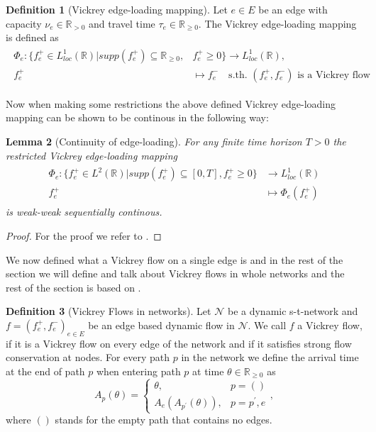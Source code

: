 \documentclass[reqno,openany]{amsbook}
\theoremstyle{definition}
\newtheorem{definition}{Definition}[chapter]
\theoremstyle{plain}
\newtheorem{lemma}[definition]{Lemma}
\begin{document}
\begin{definition}[Vickrey edge-loading mapping]
Let $e \in E$ be an edge with capacity $\nu_e \in \mathbb{R}_{> 0}$ and travel time $\tau_e \in \mathbb{R}_{\geq 0}$. The Vickrey edge-loading mapping is defined as
\begin{align}
	\begin{split}
		\Phi_e: \{f_e^+ \in L_{loc}^1(\mathbb{R}) \vert supp(f_e^+) \subseteq \mathbb{R}_{\geq 0}, &f_e^+ \geq 0\} \to 
		L_{loc}^1(\mathbb{R}), \\
		f_e^+ &\mapsto f_e^- \quad \text{s.th. $(f_e^+, f_e^-)$ is a Vickrey flow}
	\end{split}
\end{align}
\end{definition}

Now when making some restrictions the above defined Vickrey edge-loading mapping can be shown to be continous in the following way:

\begin{lemma}[Continuity of edge-loading]
For any finite time horizon $T > 0$ the restricted Vickrey edge-loading mapping 
\begin{align}
	\begin{split}
		\Phi_e: \{f_e^+ \in L^2(\mathbb{R}) \vert supp(f_e^+) \subseteq [0, T], f_e^+ \geq 0\} &\to L_{loc}^1(\mathbb{R})\\
		f_e^+ &\mapsto \Phi_e(f_e^+)
	\end{split}
\end{align}
is weak-weak sequentially continous.
\end{lemma}

\begin{proof}
For the proof we refer to {\cite[Corollary 3.46]{GRA1}}.
\end{proof}

We now defined what a Vickrey flow on a single edge is and in the rest of the section we will define and talk about Vickrey flows in whole networks and the rest of the section is based on \cite{CCL1}.

\begin{definition}[Vickrey Flows in networks]
Let $\mathcal{N}$ be a dynamic s-t-network and $f = (f_e^+, f_e^-)_{e \in E}$ be an edge based dynamic flow in $\mathcal{N}$. We call $f$ a Vickrey flow, if it is a Vickrey flow on every edge of the network and if it satisfies strong flow conservation at nodes. For every path $p$ in the network we define the arrival time at the end of path $p$ when entering path $p$ at time $\theta \in \mathbb{R}_{\geq 0}$ as 
\[A_p(\theta) = \begin{cases} \theta,& p = ()\\ A_e(A_{p^{\prime}}(\theta)),& p = p^{\prime}, e \end{cases}, \]
where $()$ stands for the empty path that contains no edges.
\end{definition}
\end{document}

